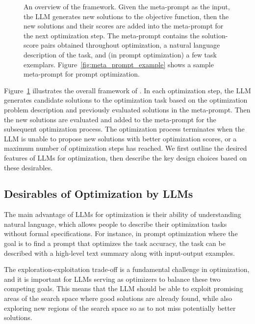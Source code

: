 \begin{figure}
\centering
{}
\caption{An overview of the \name{} framework. Given the meta-prompt as the input, the LLM generates new solutions to the objective function, then the new solutions and their scores are added into the meta-prompt for the next optimization step. The meta-prompt contains the solution-score pairs obtained throughout optimization, a natural language description of the task, and (in prompt optimization) a few task exemplars. Figure~\ref{fig:meta_prompt_example} shows a sample meta-prompt for prompt optimization.
}
\vspace{-.5em}
\label{fig:overview}
\end{figure}

Figure~\ref{fig:overview} illustrates the overall framework of \name{}. 
In each optimization step, the LLM generates candidate solutions to the optimization task based on the optimization problem description and previously evaluated solutions in the meta-prompt. 
Then the new solutions are evaluated and added to the meta-prompt for the subsequent optimization process. 
The optimization process terminates when the LLM is unable to propose new solutions with better optimization scores, or a maximum number of optimization steps has reached. 
We first outline the desired features of LLMs for optimization, then describe the key design choices based on these desirables.

\subsection{Desirables of Optimization by LLMs}

 The main advantage of LLMs for optimization is their ability of understanding natural language, which allows people to describe their optimization tasks without formal specifications. 
For instance, in prompt optimization where the goal is to find a prompt that optimizes the task accuracy, the task can be described with a high-level text summary along with input-output examples.

 The exploration-exploitation trade-off is a fundamental challenge in optimization, and it is important for LLMs serving as optimizers to balance these two competing goals. 
This means that the LLM should be able to exploit promising areas of the search space where good solutions are already found, while also exploring new regions of the search space so as to not miss potentially better solutions.


